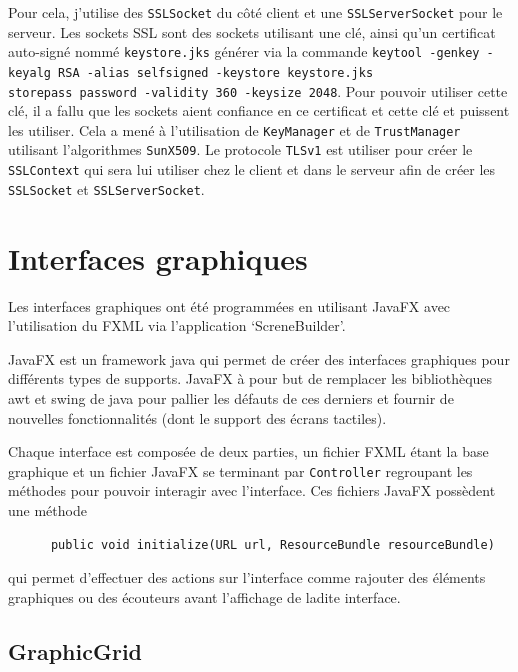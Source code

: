 \documentclass[12pt]{article}
\begin{document}
Pour cela, j'utilise des \texttt{SSLSocket} du côté client et une
\texttt{SSLServerSocket} pour le serveur. Les sockets SSL sont des sockets
utilisant une clé, ainsi qu'un certificat auto-signé nommé
\texttt{keystore.jks} générer via la commande \texttt{keytool -genkey -keyalg
      RSA -alias selfsigned -keystore keystore.jks} \\ \texttt{storepass
      password -validity 360 -keysize 2048}. Pour pouvoir utiliser cette
clé, il a fallu que les sockets aient confiance en ce certificat et cette clé
et puissent les utiliser. Cela a mené à l'utilisation de \texttt{KeyManager} et
de \texttt{TrustManager} utilisant l'algorithmes \texttt{SunX509}. Le protocole
\texttt{TLSv1} est utiliser pour créer le \texttt{SSLContext} qui sera lui
utiliser chez le client et dans le serveur afin de créer les \texttt{SSLSocket}
et \texttt{SSLServerSocket}.

\bigskip

\section{Interfaces graphiques}

Les interfaces graphiques ont été programmées en utilisant JavaFX avec
l'utilisation du FXML via l'application `ScreneBuilder'.

JavaFX est un framework java qui permet de créer des interfaces graphiques pour
différents types de supports. JavaFX à pour but de remplacer les bibliothèques
awt et swing de java pour pallier les
défauts de ces derniers et fournir de nouvelles fonctionnalités (dont le
support des écrans tactiles).

Chaque interface est
composée de deux parties, un fichier FXML étant la base graphique et un fichier
JavaFX se terminant par \texttt{Controller} regroupant les méthodes pour
pouvoir interagir avec l'interface.
Ces fichiers JavaFX possèdent une méthode
\begin{verbatim}
      public void initialize(URL url, ResourceBundle resourceBundle)
\end{verbatim}
qui permet d'effectuer des actions sur l'interface comme rajouter des éléments
graphiques ou des écouteurs avant l'affichage de ladite interface.

\bigskip

\subsection{GraphicGrid}
\end{document}

